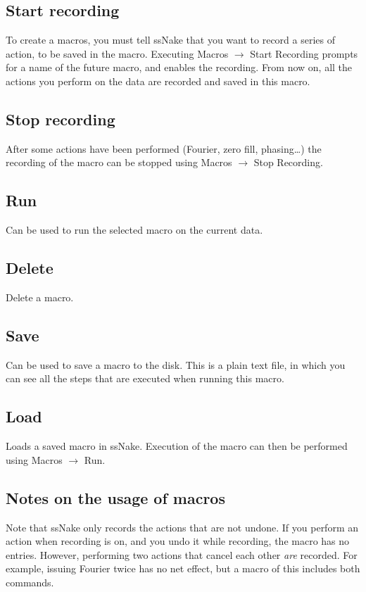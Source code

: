 \documentclass[11pt,a4paper]{article}
\begin{document}
\subsection{Start recording}
To create a macros, you must tell ssNake that you want to record a series of action, to be saved in the macro. Executing Macros $\rightarrow$ Start Recording prompts for a name of the future macro, and enables the recording. From now on, all the actions you perform on the data are recorded and saved in this macro.

\subsection{Stop recording}
After some actions have been performed (Fourier, zero fill, phasing\ldots   ) the recording of the macro can be stopped using Macros $\rightarrow$ Stop Recording.

\subsection{Run}
Can be used to run the selected macro on the current data.

\subsection{Delete}
Delete a macro.

\subsection{Save}
Can be used to save a macro to the disk. This is a plain text file, in which you can see all the steps that are executed when running this macro.

\subsection{Load}
Loads a saved macro in ssNake. Execution of the macro can then be performed using Macros $\rightarrow$ Run.

\subsection{Notes on the usage of macros}
Note that ssNake only records the actions that are not undone. If you perform an action when recording is on, and you undo it while recording, the macro has no entries. However, performing two actions that cancel each other \textit{are} recorded. For example, issuing Fourier twice has no net effect, but a macro of this includes both commands.
\end{document}
